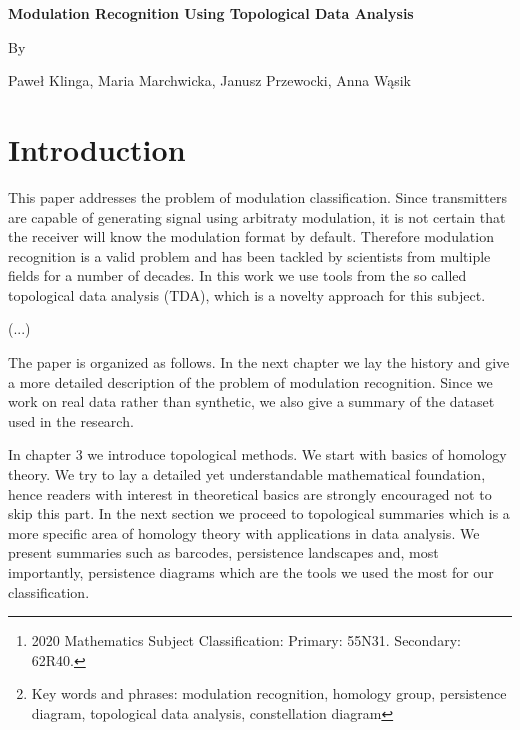 \documentclass[12pt]{article}
\theoremstyle{plain}
\theoremstyle{definition}
\theoremstyle{remark}
\begin{document}
	
	\begin{center}{\bf \Large
			Modulation Recognition Using Topological Data Analysis
		}
	\end{center}
	\smallskip
	\begin{center}
		By
	\end{center}
	\smallskip
	\begin{center} Pawe\l{} Klinga, Maria Marchwicka, Janusz Przewocki, Anna W\k{a}sik
	\end{center}
	
	\begin{abstract}
		In this paper we apply topological methods to the problem of modulation recognition. We use tools from the growing field of topological data analysis, namely persistent homology followed by machine learning algorithms to distinguish between a large number of significant modulation types.
		\let\thefootnote\relax\footnote{2020 Mathematics Subject Classification: Primary: 55N31. Secondary: 62R40.
		}
		\let\thefootnote\relax\footnote{Key words and phrases: modulation recognition, homology group, persistence diagram, topological data analysis, constellation diagram}
	\end{abstract}
	
	
	\section{Introduction}
	
	This paper addresses the problem of modulation classification. Since transmitters are capable of generating signal using arbitraty modulation, it is not certain that the receiver will know the modulation format by default. Therefore modulation recognition is a valid problem and has been tackled by scientists from multiple fields for a number of decades. In this work we use tools from the so called topological data analysis (TDA), which is a novelty approach for this subject.
	
	(...)
	
	The paper is organized as follows. In the next chapter we lay the history and give a more detailed description of the problem of modulation recognition. Since we work on real data rather than synthetic, we also give a summary of the dataset used in the research.
	
	In chapter 3 we introduce topological methods. We start with basics of homology theory. We try to lay a detailed yet understandable mathematical foundation, hence readers with interest in theoretical basics are strongly encouraged not to skip this part. In the next section we proceed to topological summaries which is a more specific area of homology theory with applications in data analysis. We present summaries such as barcodes, persistence landscapes and, most importantly, persistence diagrams which are the tools we used the most for our classification.
	
\end{document}
